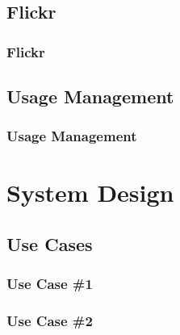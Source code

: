 \documentclass[mathserif,xcolor=dvipsnames,hyperref={bookmarks=true}]{beamer}
\begin{document}
    \subsection{Flickr}
    \begin{frame}[t]
        \frametitle{Flickr}
    \end{frame}

    \subsection{Usage Management}
    \begin{frame}[t]
        \frametitle{Usage Management}
    \end{frame}

\section{System Design}
\begin{frame}[t]
\end{frame}

    \subsection{Use Cases}

    \begin{frame}[t]
        \frametitle{Use Case \#1}
        \begin{center}
        \end{center}
    \end{frame}

    \begin{frame}[t]
        \frametitle{Use Case \#2}
        \begin{center}
        \end{center}
    \end{frame}
\end{document}
